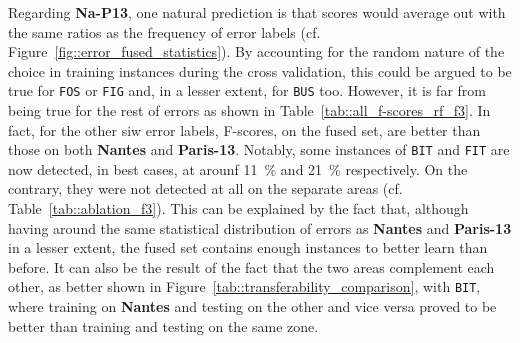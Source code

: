         Regarding \textbf{Na-P13}, one natural prediction is that scores would average out with the same ratios as the frequency of error labels (cf. Figure~\ref{fig::error_fused_statistics}).
        By accounting for the random nature of the choice in training instances during the cross validation, this could be argued to be true for \texttt{FOS} or \texttt{FIG} and, in a lesser extent, for \texttt{BUS} too.
        However, it is far from being true for the rest of errors as shown in Table~\ref{tab::all_f-scores_rf_f3}.
        In fact, for the other siw error labels, F-scores, on the fused set, are better than those on both \textbf{Nantes} and \textbf{Paris-13}.
        Notably, some instances of \texttt{BIT} and \texttt{FIT} are now detected, in best cases, at arounf \SI{11}{\percent} and \SI{21}{\percent} respectively.
        On the contrary, they were not detected at all on the separate areas (cf. Table~\ref{tab::ablation_f3}).
        This can be explained by the fact that, although having around the same statistical distribution of errors as \textbf{Nantes} and \textbf{Paris-13} in a lesser extent, the fused set contains enough instances to better learn than before.
        It can also be the result of the fact that the two areas complement each other, as better shown in Figure~\ref{tab::transferability_comparison}, with \texttt{BIT}, where training on \textbf{Nantes} and testing on the other and vice versa proved to be better than training and testing on the same zone.\\
        
        \begin{figure}[htpb]
            \centering
        \end{figure}
    
